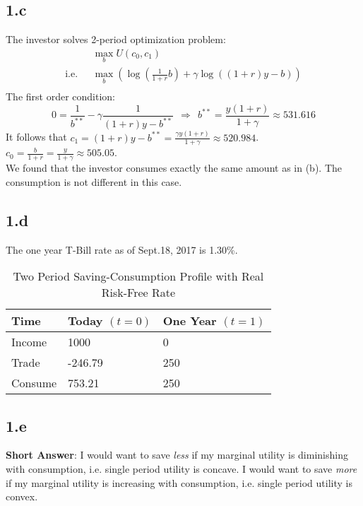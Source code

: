 \documentclass[10 pt]{hwtemplate} %
\begin{document}
\subsection*{1.c}
The investor solves 2-period optimization problem:
\begin{equation}
  \begin{split}
    &\max\limits_{b} U(c_0, c_1)\\
    \text{i.e.~~}  &\max\limits_{b} \left(\log(\tfrac{1}{1+r}b) + \gamma \log((1+r)y-b)\right) \\
  \end{split}
\end{equation}
The first order condition:
$$
0 = \frac{1}{b^{**}} - \gamma \frac{1}{(1+r)y-b^{**}}~~\Rightarrow~~b^{**} = \frac{y(1+r)}{1+\gamma} \approx 531.616
$$
It follows that $c_1= (1+r)y - b^{**}=\frac{\gamma y(1+r)}{1+\gamma}\approx 520.984$. $c_0=\tfrac{b}{1+r}=\frac{y}{1+\gamma}\approx505.05$.\\
We found that the investor consumes exactly the same amount as in (b). The consumption is not different in this case.

\subsection*{1.d} The one year T-Bill rate as of Sept.18, 2017 is 1.30\%. 
\begin{table}[htbp]
  \begin{center}
  \captionsetup{justification=centering}
  \caption{\label{tab:twoprd2}Two Period Saving-Consumption Profile with Real Risk-Free Rate}
    \begin{tabular}{lC{4cm}C{4cm}}
    \toprule
    Time &  Today $(t=0)$ & One Year $(t=1)$ \\
    \midrule
    Income & 1000 & 0 \\
    Trade & -246.79 & 250 \\
    \midrule
    Consume & 753.21 & 250 \\
    \bottomrule
    \end{tabular}
  \end{center}
\end{table}

\subsection*{1.e} \textbf{Short Answer}: I would want to save \textit{less} if my marginal utility is diminishing with consumption, i.e. single period utility is concave. I would want to save \textit{more} if my marginal utility is increasing with consumption, i.e. single period utility is convex.\\
\end{document}
